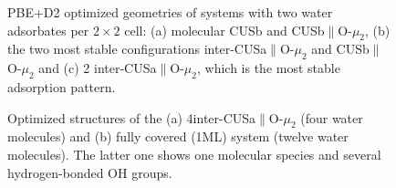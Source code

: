 \documentclass[11pt,DIV=13,BCOR=5mm,a4paper,headinclude]{scrbook}
\begin{document}
\begin{figure}[!ht]
 \centering
{}
 \quad\quad
  \quad
{}
 \quad
 \caption{PBE+D2 optimized geometries of systems with two water adsorbates per $2\times 2$ cell: (a) molecular CUSb and CUSb$\parallel$O-$\mu_2$, (b) the two most stable configurations inter-CUSa$\parallel$O-$\mu_2$ and CUSb$\parallel$O-$\mu_2$ and (c) 2 inter-CUSa$\parallel$O-$\mu_2$, which is the most stable adsorption pattern.}
        \label{abb:2water}
 \end{figure}
 \begin{figure}[!ht]
 \centering
{}
 \quad\quad
 \caption{Optimized structures of the (a) 4inter-CUSa$\parallel$O-$\mu_2$ (four water molecules) and (b) fully covered (1ML) system (twelve water molecules).
The latter one shows one molecular species and several hydrogen-bonded OH groups.}
        \label{abb:4+fully}
 \end{figure}
\end{document}
